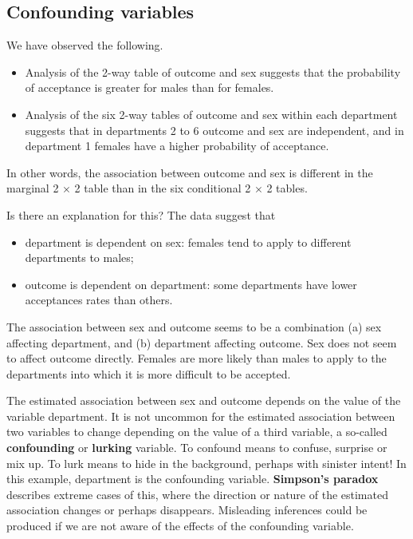 \documentclass[
  british,
  11pt,
  openany, a4paper]{book}
\providecommand{\tightlist}{%
  \setlength{\itemsep}{0pt}\setlength{\parskip}{0pt}}
\begin{document}
\subsection{Confounding variables}\label{confounding-variables}

We have observed the following.

\begin{itemize}
\tightlist
\item
  Analysis of the 2-way table of outcome and sex suggests that the probability of acceptance is greater for males than for females.
\item
  Analysis of the six 2-way tables of outcome and sex within each department suggests that in departments 2 to 6 outcome and sex are independent, and in department 1 females have a higher probability of acceptance.
\end{itemize}

In other words, the association between outcome and sex is different in the marginal 2 \(\times\) 2 table than in the six conditional 2 \(\times\) 2 tables.

Is there an explanation for this? The data suggest that

\begin{itemize}
\tightlist
\item
  department is dependent on sex: females tend to apply to different departments to males;
\item
  outcome is dependent on department: some departments have lower acceptances rates than others.
\end{itemize}

The association between sex and outcome seems to be a combination (a) sex affecting department, and (b) department affecting outcome. Sex does not seem to affect outcome directly. Females are more likely than males to apply to the departments into which it is more difficult to be accepted.

The estimated association between sex and outcome depends on the value of the variable department. It is not uncommon for the estimated association between two variables to change depending on the value of a third variable, a so-called \textbf{confounding} or \textbf{lurking} variable. To confound means to confuse, surprise or mix up. To lurk means to hide in the background, perhaps with sinister intent! In this example, department is the confounding variable. \textbf{Simpson's paradox} describes extreme cases of this, where the direction or nature of the estimated association changes or perhaps disappears. Misleading inferences could be produced if we are not aware of the effects of the confounding variable.
\end{document}
